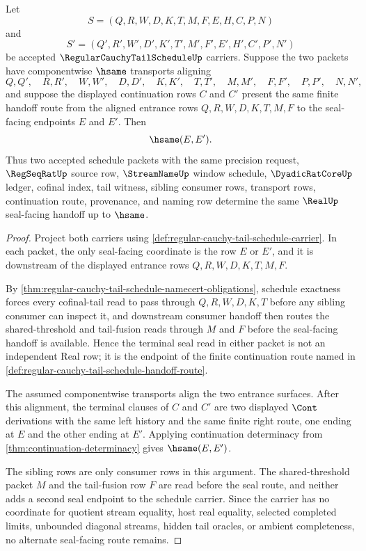\begin{theorem}
\label{thm:regular-cauchy-tail-schedule-seal-facing-route-determinacy}
Let
$$
S=(Q,R,W,D,K,T,M,F,E,H,C,P,N)
$$
and
$$
S'=(Q',R',W',D',K',T',M',F',E',H',C',P',N')
$$
be accepted $\RegularCauchyTailScheduleUp$ carriers. Suppose the two packets have componentwise $\hsame$ transports aligning
$$
Q,Q',\quad R,R',\quad W,W',\quad D,D',\quad K,K',\quad T,T',\quad M,M',\quad F,F',\quad P,P',\quad N,N',
$$
and suppose the displayed continuation rows $C$ and $C'$ present the same finite handoff route from the aligned entrance rows $Q,R,W,D,K,T,M,F$ to the seal-facing endpoints $E$ and $E'$. Then
$$
\hsame(E,E').
$$
Thus two accepted schedule packets with the same precision request, $\RegSeqRatUp$ source row, $\StreamNameUp$ window schedule, $\DyadicRatCoreUp$ ledger, cofinal index, tail witness, sibling consumer rows, transport rows, continuation route, provenance, and naming row determine the same $\RealUp$ seal-facing handoff up to $\hsame$.
\end{theorem}
\begin{proof}
Project both carriers using \autoref{def:regular-cauchy-tail-schedule-carrier}. In each packet, the only seal-facing coordinate is the row $E$ or $E'$, and it is downstream of the displayed entrance rows $Q,R,W,D,K,T,M,F$.

By \autoref{thm:regular-cauchy-tail-schedule-namecert-obligations}, schedule exactness forces every cofinal-tail read to pass through $Q,R,W,D,K,T$ before any sibling consumer can inspect it, and downstream consumer handoff then routes the shared-threshold and tail-fusion reads through $M$ and $F$ before the seal-facing handoff is available. Hence the terminal seal read in either packet is not an independent Real row; it is the endpoint of the finite continuation route named in \autoref{def:regular-cauchy-tail-schedule-handoff-route}.

The assumed componentwise transports align the two entrance surfaces. After this alignment, the terminal clauses of $C$ and $C'$ are two displayed $\Cont$ derivations with the same left history and the same finite right route, one ending at $E$ and the other ending at $E'$. Applying continuation determinacy from \autoref{thm:continuation-determinacy} gives $\hsame(E,E')$.

The sibling rows are only consumer rows in this argument. The shared-threshold packet $M$ and the tail-fusion row $F$ are read before the seal route, and neither adds a second seal endpoint to the schedule carrier. Since the carrier has no coordinate for quotient stream equality, host real equality, selected completed limits, unbounded diagonal streams, hidden tail oracles, or ambient completeness, no alternate seal-facing route remains.
\end{proof}
